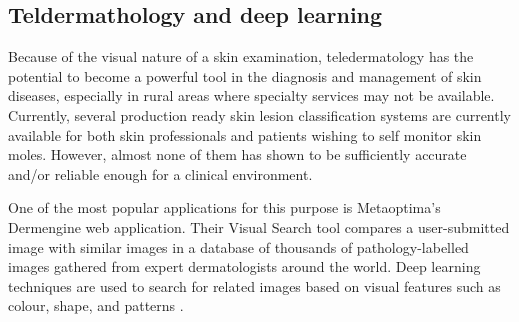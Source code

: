 \documentclass[journal,compsoc]{IEEEtran}
\begin{document}
\subsection{Teldermathology and deep learning}
Because of the visual nature of a skin examination, teledermatology has the potential to become a powerful tool in the diagnosis and management of skin diseases, especially in rural areas where specialty services may not be available. 
Currently, several production ready skin lesion classification systems are currently available for both skin professionals and patients wishing to self monitor skin moles. However, almost none of them has shown to be sufficiently accurate and/or reliable enough for a clinical environment. \par 
One of the most popular applications for this purpose is Metaoptima's Dermengine web application. Their Visual Search tool compares a user-submitted image with similar images in a database of thousands of pathology-labelled images gathered from expert dermatologists around the world. Deep learning techniques are used to search for related images based on visual features such as colour, shape, and patterns \cite{dermengine}. \par
%
%

\end{document}
